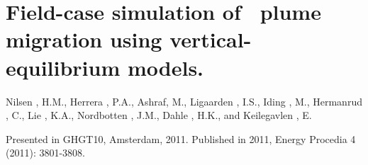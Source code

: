\section{Field-case simulation of \coo\ plume migration using vertical-equilibrium models.}

\noindent Nilsen , H.M., Herrera , P.A., Ashraf, M., Ligaarden , I.S., Iding , M., Hermanrud ,
C., Lie , K.A., Nordbotten , J.M., Dahle , H.K., and Keilegavlen , E.


\noindent Presented in GHGT10, Amsterdam, 2011. Published in 2011, Energy Procedia 4 (2011): 3801-3808.

\cleardoublepage


